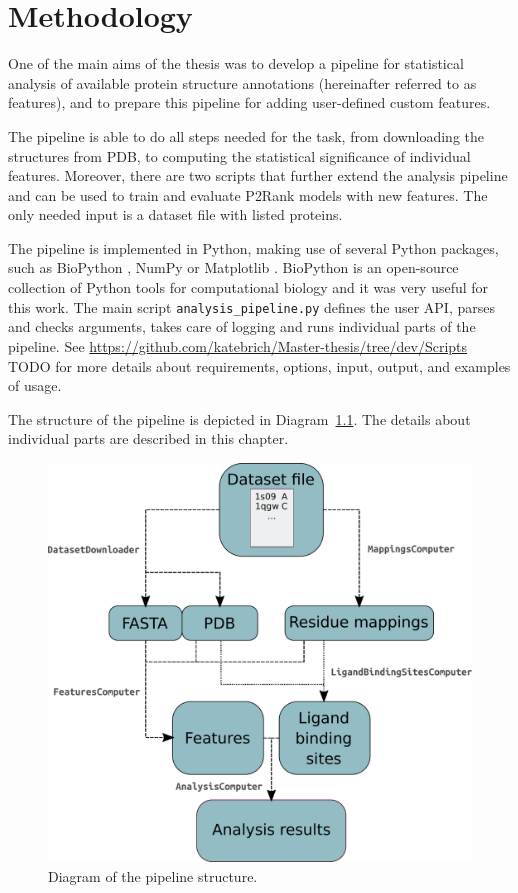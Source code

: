 
\chapter{Methodology}

One of the main aims of the thesis was to develop a pipeline for statistical analysis of available protein structure annotations (hereinafter referred to as features), and to prepare this pipeline for adding user-defined custom features.

The pipeline is able to do all steps needed for the task, from downloading the structures from PDB, to computing the statistical significance of individual features. Moreover, there are two scripts that further extend the analysis pipeline and can be used to train and evaluate P2Rank models with new features. The only needed input is a dataset file with listed proteins.

The pipeline is implemented in Python, making use of several Python packages, such as BioPython \cite{biopython}, NumPy \cite{numpy} or Matplotlib \cite{maplotlib}. BioPython is an open-source collection of Python tools for computational biology and it was very useful for this work. The main script \texttt{analysis\_pipeline.py} defines the user API, parses and checks arguments, takes care of logging and runs individual parts of the pipeline. See \url{ https://github.com/katebrich/Master-thesis/tree/dev/Scripts} TODO for more details about requirements, options, input, output, and examples of usage.

The structure of the pipeline is depicted in Diagram~\ref{fig:diagram}. The details about individual parts are described in this chapter.

\begin{figure}[!htbp]\centering
\includegraphics[width=120mm]{../img/pipelineDiagram.pdf}
\caption{Diagram of the pipeline structure.}
\label{fig:diagram}
\end{figure}

